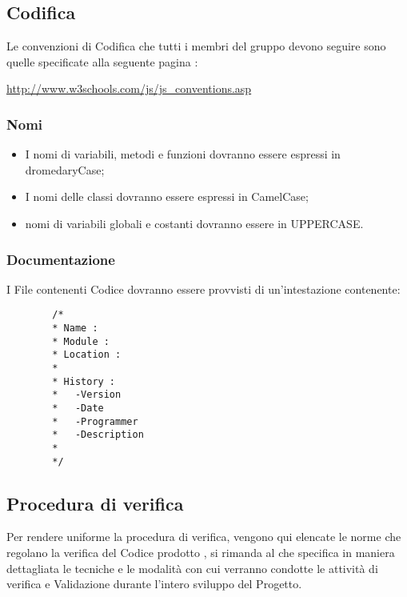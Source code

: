 	
	
	
	
	
	
	\subsection{Codifica}
	Le convenzioni di Codifica che tutti i membri del gruppo devono seguire sono quelle
	specificate alla seguente pagina :\\
	\begin{center} \url{http://www.w3schools.com/js/js_conventions.asp} \end{center}
	\subsubsection{Nomi}
	\begin{itemize}
	\item I nomi di variabili, metodi e funzioni dovranno essere espressi in dromedaryCase;
	\item I nomi delle classi dovranno essere espressi in CamelCase;
	\item nomi di variabili globali e costanti dovranno essere in UPPERCASE.
	\end{itemize}
	\subsubsection{Documentazione}
	I File contenenti Codice dovranno essere provvisti di un'intestazione contenente:
	\begin{lstlisting}
		/*
		* Name :  
		* Module :
		* Location :
		*
		* History :
		*   -Version       
		*   -Date
		*   -Programmer           
		*   -Description
		*
		*/	    
    \end{lstlisting}
   
   \subsection{Procedura di verifica}
   Per rendere uniforme la procedura di verifica, vengono qui elencate le norme che regolano la verifica del Codice prodotto , si rimanda al \href{run:../../Esterni/\fPianoDiQualifica}{\fEscapePianoDiQualifica} che specifica in maniera dettagliata le tecniche e le modalità con cui verranno condotte le attività di verifica e Validazione durante l’intero sviluppo del Progetto.
   
